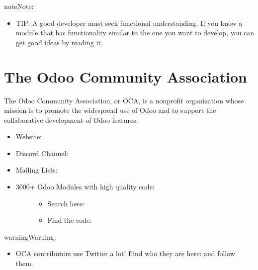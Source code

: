 \documentclass[letterpaper,10pt,english]{sphinxmanual}
\begin{document}
\begin{sphinxadmonition}{note}{Note:}\begin{itemize}
\item {} 
TIP: A good developer must seek functional understanding. If you know a module that has functionality similar to the one you want to develop, you can get good ideas by reading it.

\end{itemize}
\end{sphinxadmonition}


\section{The Odoo Community Association}
\label{\detokenize{technical:the-odoo-community-association}}
The Odoo Community Association, or OCA, is a nonprofit organization whose mission is to
promote the widespread use of Odoo and to support the collaborative development
of Odoo features.
\begin{itemize}
\item {} 
Website: 

\item {} 
Discord Channel: 

\item {} 
Mailing Lists: 

\end{itemize}
\begin{itemize}
\item {} \begin{description}
\item[{3000+ Odoo Modules with high quality code:}] \leavevmode\begin{itemize}
\item {} 
Search here: 

\item {} 
Find the code: 

\end{itemize}

\end{description}

\end{itemize}

\begin{sphinxadmonition}{warning}{Warning:}\begin{itemize}
\item {} 
OCA contributors use Twitter a lot! Find who they are here:  and follow them.

\end{itemize}
\end{sphinxadmonition}
\end{document}
